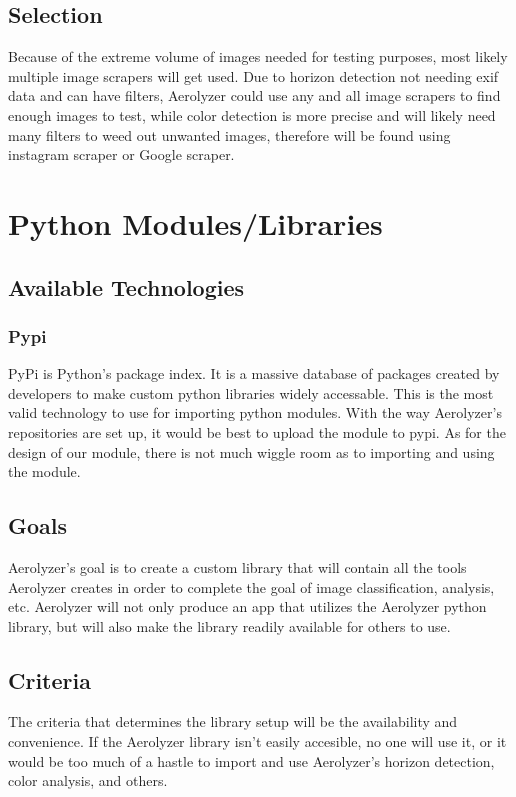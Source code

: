 \documentclass[onecolumn, draftclsnofoot,10pt, compsoc]{IEEEtran}
\begin{document}
\begin{singlespace}
\subsection{Selection}
Because of the extreme volume of images needed for testing purposes, most likely multiple image scrapers will get used. Due to horizon detection not needing exif data and can have filters, Aerolyzer could use any and all image scrapers to find enough images to test, while color detection is more precise and will likely need many filters to weed out unwanted images, therefore will be found using instagram scraper or Google scraper.


\section{Python Modules/Libraries}
\subsection{Available Technologies}
\subsubsection{Pypi}
PyPi is Python's package index. It is a massive database of packages created by developers to make custom python libraries widely accessable. This is the most valid technology to use for importing python modules. With the way Aerolyzer's repositories are set up, it would be best to upload the module to pypi. As for the design of our module, there is not much wiggle room as to importing and using the module. \cite{pypi}

\subsection{Goals}
Aerolyzer's goal is to create a custom library that will contain all the tools Aerolyzer creates in order to complete the goal of image classification, analysis, etc. Aerolyzer will not only produce an app that utilizes the Aerolyzer python library, but will also make the library readily available for others to use.

\subsection{Criteria}
The criteria that determines the library setup will be the availability and convenience. If the Aerolyzer library isn't easily accesible, no one will use it, or it would be too much of a hastle to import and use Aerolyzer's horizon detection, color analysis, and others.

\end{singlespace}
\end{document}
